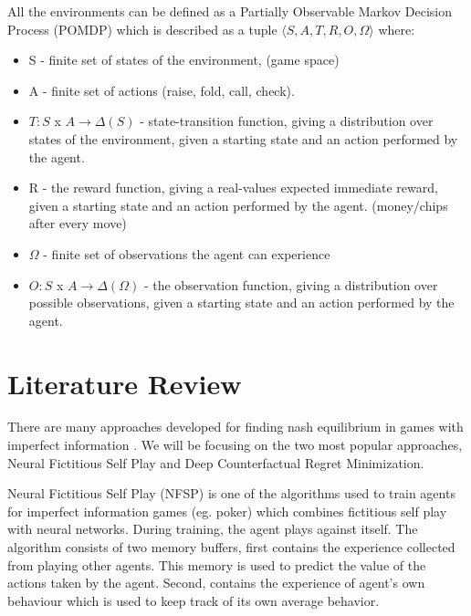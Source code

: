 \documentclass{article}
\begin{document}
All the environments can be defined as a Partially Observable Markov Decision Process (POMDP) which is described as a tuple $\langle S, A, T, R, O, \Omega \rangle$ where:
\begin{itemize}
    \item S - finite set of states of the environment, (game space)
    
    \item A - finite set of actions (raise, fold, call, check).
    
    \item $T: S$ x $A \rightarrow \Delta(S)$ - state-transition function, giving a distribution over states of the environment, given a starting state and an action performed by the agent.
    
    \item R -  the reward function, giving a real-values expected immediate reward, given a starting state and an action performed by the agent. (money/chips after every move)
    
    \item $\Omega$ - finite set of observations the agent can experience
    
    \item $O: S$ x $ A \rightarrow \Delta(\Omega)$ -  the observation function, giving a distribution over possible observations, given a starting state and an action performed by the agent.
\end{itemize}

\section{Literature Review}

There are many approaches developed for finding nash equilibrium in games with imperfect information \cite{rebel:2020, dcfr:2018, nsfp:2016, deepstack}. We will be focusing on the two most popular approaches, Neural Fictitious Self Play and Deep Counterfactual Regret Minimization.

Neural Fictitious Self Play (NFSP) \cite{nsfp:2016} is one of the algorithms used to train agents for imperfect information games (eg. poker) which combines fictitious self play with neural networks. During training, the agent plays against itself. The algorithm consists of two memory buffers, first contains the experience collected from playing other agents. This memory is used to predict the value of the actions taken by the agent. Second, contains the experience of agent's own behaviour which is used to keep track of its own average behavior.
\end{document}
